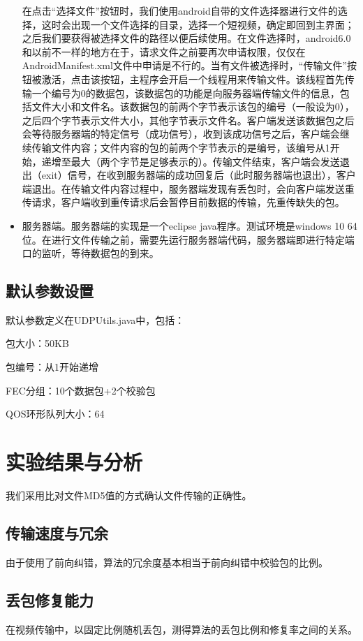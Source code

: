 \documentclass[onecolumn]{article}
\begin{document}
\begin{CJK*}{UTF8}{gbsn}
\begin{itemize}
			
			在点击“选择文件”按钮时，我们使用android自带的文件选择器进行文件的选择，这时会出现一个文件选择的目录，选择一个短视频，确定即回到主界面；之后我们要获得被选择文件的路径以便后续使用。在文件选择时，android6.0和以前不一样的地方在于，请求文件之前要再次申请权限，仅仅在AndroidManifest.xml文件中申请是不行的。当有文件被选择时，“传输文件”按钮被激活，点击该按钮，主程序会开启一个线程用来传输文件。该线程首先传输一个编号为0的数据包，该数据包的功能是向服务器端传输文件的信息，包括文件大小和文件名。该数据包的前两个字节表示该包的编号（一般设为0），之后四个字节表示文件大小，其他字节表示文件名。客户端发送该数据包之后会等待服务器端的特定信号（成功信号），收到该成功信号之后，客户端会继续传输文件内容；文件内容的包的前两个字节表示的是编号，该编号从1开始，递增至最大（两个字节是足够表示的）。传输文件结束，客户端会发送退出（exit）信号，在收到服务器端的成功回复后（此时服务器端也退出），客户端退出。在传输文件内容过程中，服务器端发现有丢包时，会向客户端发送重传请求，客户端收到重传请求后会暂停目前数据的传输，先重传缺失的包。
			
			\item 服务器端。服务器端的实现是一个eclipse java程序。测试环境是windows 10 64位。在进行文件传输之前，需要先运行服务器端代码，服务器端即进行特定端口的监听，等待数据包的到来。 
		\end{itemize}
		\subsection{默认参数设置}
		默认参数定义在UDPUtils.java中，包括：
		
		包大小：50KB
		
		包编号：从1开始递增
		
		FEC分组：10个数据包+2个校验包
		
		QOS环形队列大小：64
		
\section{实验结果与分析}
		我们采用比对文件MD5值的方式确认文件传输的正确性。
		\subsection{传输速度与冗余}
		由于使用了前向纠错，算法的冗余度基本相当于前向纠错中校验包的比例。
		
		
		\subsection{丢包修复能力}
		在视频传输中，以固定比例随机丢包，测得算法的丢包比例和修复率之间的关系。
		
		
	\end{CJK*}
	
\end{document}
